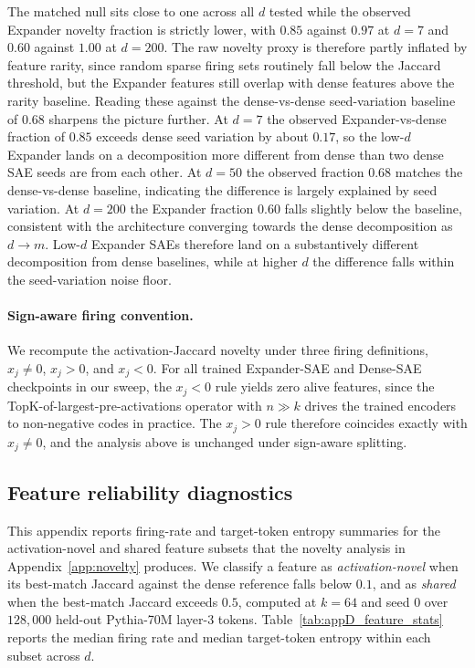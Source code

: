 \documentclass{article}
\theoremstyle{plain}
\theoremstyle{definition}
\theoremstyle{remark}
\begin{document}
The matched null sits close to one across all $d$ tested while the observed Expander novelty fraction is strictly lower, with $0.85$ against $0.97$ at $d{=}7$ and $0.60$ against $1.00$ at $d{=}200$. The raw novelty proxy is therefore partly inflated by feature rarity, since random sparse firing sets routinely fall below the Jaccard threshold, but the Expander features still overlap with dense features above the rarity baseline. Reading these against the dense-vs-dense seed-variation baseline of $0.68$ sharpens the picture further. At $d{=}7$ the observed Expander-vs-dense fraction of $0.85$ exceeds dense seed variation by about $0.17$, so the low-$d$ Expander lands on a decomposition more different from dense than two dense SAE seeds are from each other. At $d{=}50$ the observed fraction $0.68$ matches the dense-vs-dense baseline, indicating the difference is largely explained by seed variation. At $d{=}200$ the Expander fraction $0.60$ falls slightly below the baseline, consistent with the architecture converging towards the dense decomposition as $d \to m$. Low-$d$ Expander SAEs therefore land on a substantively different decomposition from dense baselines, while at higher $d$ the difference falls within the seed-variation noise floor.

\paragraph{Sign-aware firing convention.} We recompute the activation-Jaccard novelty under three firing definitions, $x_j \neq 0$, $x_j > 0$, and $x_j < 0$. For all trained Expander-SAE and Dense-SAE checkpoints in our sweep, the $x_j < 0$ rule yields zero alive features, since the TopK-of-largest-pre-activations operator with $n \gg k$ drives the trained encoders to non-negative codes in practice. The $x_j > 0$ rule therefore coincides exactly with $x_j \neq 0$, and the analysis above is unchanged under sign-aware splitting.

\subsection{Feature reliability diagnostics}
\label{app:reliability}

This appendix reports firing-rate and target-token entropy summaries for the activation-novel and shared feature subsets that the novelty analysis in Appendix~\ref{app:novelty} produces. We classify a feature as \emph{activation-novel} when its best-match Jaccard against the dense reference falls below $0.1$, and as \emph{shared} when the best-match Jaccard exceeds $0.5$, computed at $k{=}64$ and seed 0 over $128{,}000$ held-out Pythia-70M layer-3 tokens. Table~\ref{tab:appD_feature_stats} reports the median firing rate and median target-token entropy within each subset across $d$.
\end{document}
